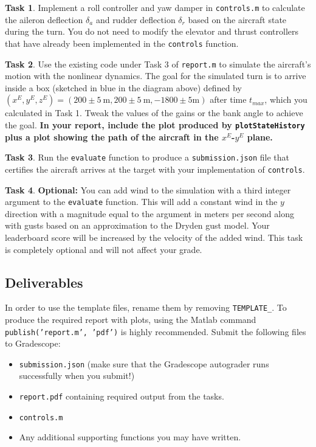 \documentclass{article}
\theoremstyle{definition}
\newtheorem{task}{Task}
\begin{document}
\begin{task}
    Implement a roll controller and yaw damper in \texttt{controls.m} to calculate the aileron deflection $\delta_a$ and rudder deflection $\delta_r$ based on the aircraft state during the turn. 
You do not need to modify the elevator and thrust controllers that have already been implemented in the \texttt{controls} function.
\end{task}

\begin{task}
    Use the existing code under Task 3 of \texttt{report.m} to simulate the aircraft's motion with the nonlinear dynamics. The goal for the simulated turn is to arrive inside a box (sketched in blue in the diagram above) defined by $(x^E,y^E,z^E) = (200 \pm 5\ \text{m},200 \pm 5\ \text{m}, -1800 \pm 5 \text{m})$ after time $t_{max}$, which you calculated in Task 1. Tweak the values of the gains or the bank angle to achieve the goal.
    \textbf{In your report, include the plot produced by \texttt{plotStateHistory} plus a plot showing the path of the aircraft in the $x^E$-$y^E$ plane.}
\end{task}

\begin{task}
    Run the \texttt{evaluate} function to produce a \texttt{submission.json} file that certifies the aircraft arrives at the target with your implementation of \texttt{controls}.
\end{task}

\begin{task}
    \textbf{Optional:}
    You can add wind to the simulation with a third integer argument to the \texttt{evaluate} function. This will add a constant wind in the $y$ direction with a magnitude equal to the argument in meters per second along with gusts based on an approximation to the Dryden gust model. Your leaderboard score will be increased by the velocity of the added wind. This task is completely optional and will not affect your grade.
\end{task}

\subsection*{Deliverables}
In order to use the template files, rename them by removing \texttt{TEMPLATE\_}. To produce the required report with plots, using the Matlab command \texttt{publish('report.m', 'pdf')} is highly recommended. Submit the following files to Gradescope:

\begin{itemize}[noitemsep]
    \item \texttt{submission.json} (make sure that the Gradescope autograder runs successfully when you submit!)
    \item \texttt{report.pdf} containing required output from the tasks.
    \item \texttt{controls.m}
    \item Any additional supporting functions you may have written.
\end{itemize}
\end{document}
